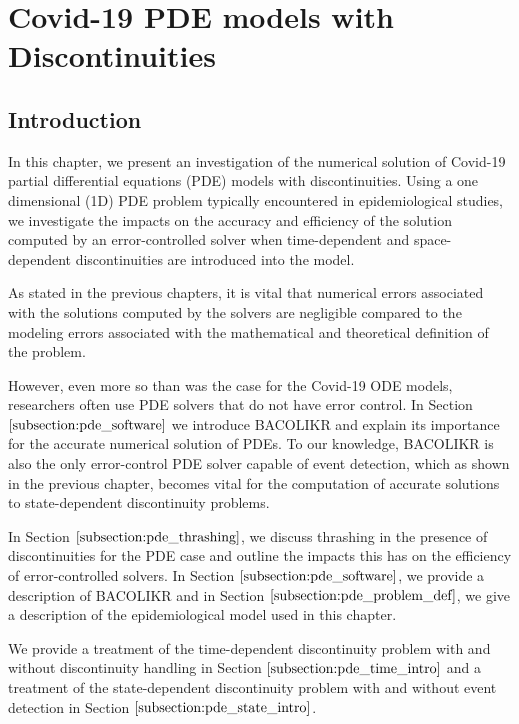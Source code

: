 \documentclass{article}
\begin{document}
\section{Covid-19 PDE models with Discontinuities}
\subsection{Introduction}
\label{subsection:pde_intro}
In this chapter, we present an investigation of the numerical solution of Covid-19 partial differential equations (PDE) models with discontinuities. Using a one dimensional (1D) PDE problem typically encountered in epidemiological studies, we investigate the impacts on the accuracy and efficiency of the solution computed by an error-controlled solver when time-dependent and space-dependent discontinuities are introduced into the model.

As stated in the previous chapters, it is vital that numerical errors associated with the solutions computed by the solvers are negligible compared to the modeling errors associated with the mathematical and theoretical definition of the problem.

However, even more so than was the case for the Covid-19 ODE models, researchers often use PDE solvers that do not have error control. In Section $\ref{subsection:pde_software}$ we introduce BACOLIKR and explain its importance for the accurate numerical solution of PDEs. To our knowledge, BACOLIKR is also the only error-control PDE solver capable of event detection, which as shown in the previous chapter, becomes vital for the computation of accurate solutions to state-dependent discontinuity problems.

In Section $\ref{subsection:pde_thrashing}$, we discuss thrashing in the presence of discontinuities for the PDE case and outline the impacts this has on the efficiency of error-controlled solvers. In Section $\ref{subsection:pde_software}$, we provide a description of BACOLIKR and in Section $\ref{subsection:pde_problem_def}$, we give a description of the epidemiological model used in this chapter.

We provide a treatment of the time-dependent discontinuity problem with and without discontinuity handling in Section $\ref{subsection:pde_time_intro}$ and a treatment of the state-dependent discontinuity problem with and without event detection in Section $\ref{subsection:pde_state_intro}$.
\end{document}
